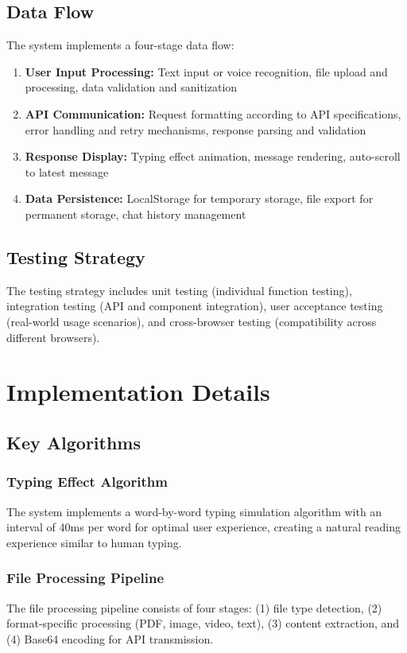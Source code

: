\documentclass[conference]{IEEEtran}
\begin{document}
\subsection{Data Flow}
The system implements a four-stage data flow:
\begin{enumerate}[itemsep=0pt, parsep=0pt]
    \item \textbf{User Input Processing:} Text input or voice recognition, file upload and processing, data validation and sanitization
    \item \textbf{API Communication:} Request formatting according to API specifications, error handling and retry mechanisms, response parsing and validation
    \item \textbf{Response Display:} Typing effect animation, message rendering, auto-scroll to latest message
    \item \textbf{Data Persistence:} LocalStorage for temporary storage, file export for permanent storage, chat history management
\end{enumerate}

\subsection{Testing Strategy}
The testing strategy includes unit testing (individual function testing), integration testing (API and component integration), user acceptance testing (real-world usage scenarios), and cross-browser testing (compatibility across different browsers).

\section{Implementation Details}

\subsection{Key Algorithms}

\subsubsection{Typing Effect Algorithm}
The system implements a word-by-word typing simulation algorithm with an interval of 40ms per word for optimal user experience, creating a natural reading experience similar to human typing.

\subsubsection{File Processing Pipeline}
The file processing pipeline consists of four stages: (1) file type detection, (2) format-specific processing (PDF, image, video, text), (3) content extraction, and (4) Base64 encoding for API transmission.
\end{document}
